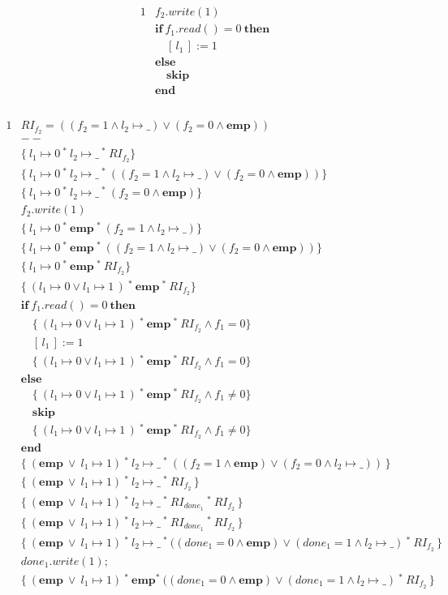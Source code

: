 \documentclass[12pt]{article}
\newcommand{\ifstmt}[3]{
  & \textbf{if}\ #1\ \textbf{then}\ \\
  #2\ \\
  & \textbf{else} \\
  #3\ \\
  & \textbf{end} \\
}
\newcommand{\mt}[2]{
  #1 \mapsto #2
}
\newcommand{\sepcon}[2]{
  #1\ ^*\ #2
}
\newcommand{\emp}{
  \textbf{emp}
}
\newcommand{\riftwofst}{
  (f_2 = 1 \land \mt{l_2}{\_})
}
\newcommand{\riftwosnd}{
  ( f_2 = 0 \land \emp)
}
\newcommand{\riftwo}{
  (\riftwofst \lor \riftwosnd)
}
\begin{document}
\begin{alignat*}{1}
  &  f_2.write(1) \\
  \ifstmt{ f_1.read() = 0}{& \quad [\,l_1\,] := 1}{& \quad \textbf{skip}} \\
\end{alignat*}

\begin{alignat*}{1}
  & RI_{f_2} = \riftwo \\
  & -- \\
  & \{\ \sepcon{\mt{l_1}{0}}{\sepcon{\mt{l_2}{\_}}{RI_{f_2}}}\} \\
  & \{\ \sepcon{\mt{l_1}{0}}{\sepcon{\mt{l_2}{\_}}{\riftwo}}\} \\
  & \{\ \sepcon{\mt{l_1}{0}}{\sepcon{\mt{l_2}{\_}}{\riftwosnd}}\} \\
  &  f_2.write( 1 ) \\
  & \{\ \sepcon{\mt{l_1}{0}}{\sepcon{\emp}{\riftwofst}}\} \\
  & \{\ \sepcon{\mt{l_1}{0}}{\sepcon{\emp}{\riftwo}}\} \\
  & \{\ \sepcon{\mt{l_1}{0}}{\sepcon{\emp}{RI_{f_2}}}\} \\
  & \{\ \sepcon{(\mt{l_1}{0} \lor \mt{l_1}{1}\,)}{\sepcon{\emp}{RI_{f_2}}}\} \\
  \ifstmt{
    f_1.read() = 0
  }{
    & \quad \{\ \sepcon{(\mt{l_1}{0} \lor \mt{l_1}{1}\,)}{\sepcon{\emp}{RI_{f_2}}} \land f_1 = 0\} \\
    & \quad [\,l_1\,] := 1 \\
    & \quad \{\
    \sepcon{
      (\mt{l_1}{0} \lor \mt{l_1}{1}\,)
    }{
      \sepcon{\emp}{RI_{f_2}}
    }
    \land f_1 = 0\}
  }{
    & \quad \{\
    \sepcon{
      (\mt{l_1}{0} \lor \mt{l_1}{1}\,)
    }{
      \sepcon{\emp}{RI_{f_2}}
    }
    \land f_1 \neq 0\} \\
    & \quad \textbf{skip} \\
    & \quad \{\
    \sepcon{
      (\mt{l_1}{0} \lor \mt{l_1}{1}\,)
    }{
      \sepcon{\emp}{RI_{f_2}}
    }
    \land f_1 \neq 0\}
  }
  & \{\ (\emp\ \lor\ \mt{l_1}{1})\ ^*\  \mt{l_2}{\_}\ ^*\ (( f_2 = 1 \land \emp) \lor ( f_2 = 0 \land \mt{l_2}{\_} ))\,\} \\
  & \{\ (\emp\ \lor\ \mt{l_1}{1})\ ^*\  \mt{l_2}{\_}\ ^*\ RI_{f_2}\,\} \\
  & \{\ (\emp\ \lor\ \mt{l_1}{1})\ ^*\  \mt{l_2}{\_}\ ^*\ RI_{done_1}\ ^*\ RI_{f_2}\,\} \\
  & \{\ (\emp\ \lor\ \mt{l_1}{1})\ ^*\  \mt{l_2}{\_}\ ^*\ RI_{done_1}\ ^*\ RI_{f_2}\,\} \\
  & \{\ (\emp\ \lor\ \mt{l_1}{1})\ ^*\  \mt{l_2}{\_}\ ^*\ ((done_1 = 0 \land \emp ) \lor (done_1 = 1 \land \mt{l_2}{\_})\ ^*\ RI_{f_2}\,\} \\
  & done_1.write(1); \\
  & \{\ (\emp\ \lor\ \mt{l_1}{1})\ ^*\  \emp ^*\ ((done_1 = 0 \land \emp ) \lor (done_1 = 1 \land \mt{l_2}{\_})\ ^*\ RI_{f_2}\,\}
\end{alignat*}
\end{document}
